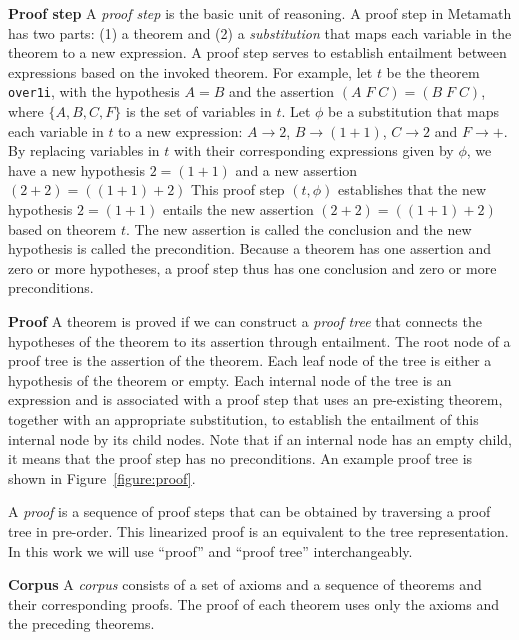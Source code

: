 \documentclass{article}
\begin{document}
\noindent\textbf{Proof step}
A \emph{proof step} is the basic unit of reasoning. 
A proof step in Metamath has two parts: (1) a theorem and (2) a \emph{substitution} that maps each variable in the theorem to a new expression. 
A proof step serves to establish entailment between expressions based on the invoked theorem. 
 For example, let $t$ be the theorem \texttt{over1i}, 
 with the hypothesis $A=B$ and the assertion $(A\;F\;C)=(B\;F\;C)$,
where $\{A,B,C,F\}$ is the set of variables in $t$.
Let $\phi$ be a substitution that maps each variable in $t$ to  a new expression:
$A \rightarrow 2$, $B \rightarrow (1+1)$, $C \rightarrow 2$ and $F \rightarrow + $.
By replacing variables in $t$ with their corresponding expressions given by $\phi$,
we have a new hypothesis $2=(1+1)$ and a new assertion $(2+2)=((1+1)+2)$
This proof step $(t,\phi)$ establishes that  the new hypothesis $2=(1+1)$ entails the new assertion $(2+2)=((1+1)+2)$ based on theorem $t$. 
The new assertion is called the conclusion
and the new hypothesis is called the precondition.
Because a theorem has one assertion and zero or more hypotheses, a proof step thus has one conclusion and zero or more preconditions. 

\noindent\textbf{Proof}
A theorem is proved if we can construct a \emph{proof tree} that connects the hypotheses of the theorem to its assertion through entailment. 
The root node of a proof tree is the assertion of the theorem. Each leaf node of the tree is either a hypothesis of the theorem or empty. 
Each internal node of the tree is an expression and is associated with a proof step that uses an pre-existing theorem, together with an appropriate substitution, to establish the entailment of this internal node by its child nodes. 
Note that if an internal node has an empty child, it means that the proof step has no preconditions. An example proof tree is shown in Figure~\ref{figure:proof}. 

A \emph{proof} is a sequence of proof steps that can be obtained by traversing a proof tree in pre-order. This linearized proof is an equivalent to the tree representation. In this work we will use ``proof'' and ``proof tree'' interchangeably. 

\noindent\textbf{Corpus}
A \emph{corpus} consists of a set of axioms and a sequence of theorems and their corresponding proofs. The proof of each theorem uses only the axioms and the preceding theorems. 
\end{document}
